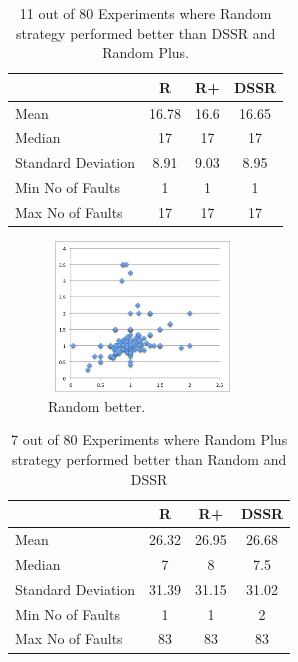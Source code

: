 \documentclass[conference]{IEEEtran}
\begin{document}
\begin{table}[H]
\caption{11 out of 80 Experiments where Random strategy performed better than DSSR and Random Plus.}
\centering
\begin{tabular}{|l|c|c|c|}
\hline\hline
 				& R			& R+				&  DSSR	\\
\hline
Mean  			&    16.78		&  16.6			&  16.65	\\
Median 			&    17    		&  17				&  17 	\\
Standard Deviation 	&    8.91		&  9.03			&  8.95	\\		
Min No of Faults	&    1			&  1				&  1\\
Max No of Faults 	&    17		&  17				& 17\\
\hline
\end{tabular}
\label{table:Randombetter}
\end{table}

\begin{figure}[ht]
\centering
\includegraphics[width=5cm,height=4cm]{Randombetter5.png}
\caption{Random better.}
\label{fig:Randombetter}
\end{figure}




\begin{table}[H]
\caption{7 out of 80 Experiments where Random Plus strategy performed better than Random and DSSR}
\centering
\begin{tabular}{|l|c|c|c|}
\hline\hline
 				& R			& R+				&  DSSR 	\\
\hline
Mean  			&    26.32		&  26.95			&  26.68\\
Median 			&    7 		&  8	 			&  7.5 \\
Standard Deviation 	&    31.39		&  31.15			&  31.02\\
Min No of Faults	&    1			&  1				&  2\\
Max No of Faults 	&    83		&  83				&  83\\
\hline
\end{tabular}
\label{table:RandomPlusbetter}
\end{table}
\end{document}
